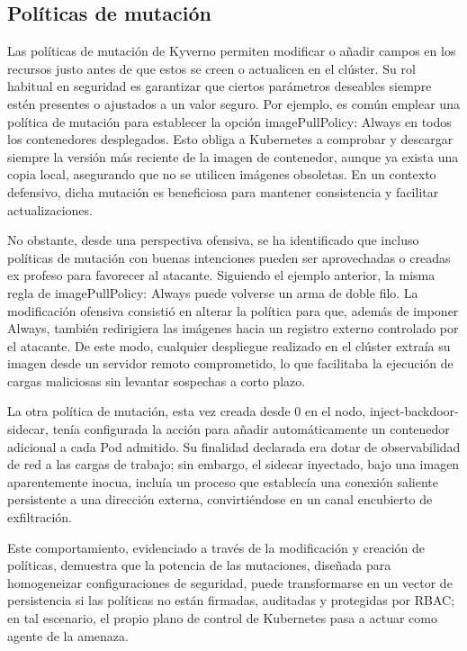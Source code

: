 \documentclass[12pt,twoside,titlepage]{report}
\begin{document}
\subsection{Políticas de mutación}                                                                           Las políticas de mutación de Kyverno permiten modificar o añadir campos en los recursos justo antes de que estos se creen o actualicen en el clúster. Su rol habitual en seguridad es garantizar que ciertos parámetros deseables siempre estén presentes o ajustados a un valor seguro. Por ejemplo, es común emplear una política de mutación para establecer la opción imagePullPolicy: Always en todos los contenedores desplegados. Esto obliga a Kubernetes a comprobar y descargar siempre la versión más reciente de la imagen de contenedor, aunque ya exista una copia local, asegurando que no se utilicen imágenes obsoletas. En un contexto defensivo, dicha mutación es beneficiosa para mantener consistencia y facilitar actualizaciones. 

No obstante, desde una perspectiva ofensiva, se ha identificado que incluso políticas de mutación con buenas intenciones pueden ser aprovechadas o creadas ex profeso para favorecer al atacante. Siguiendo el ejemplo anterior, la misma regla de imagePullPolicy: Always puede volverse un arma de doble filo. La modificación ofensiva consistió en alterar la política para que, además de imponer Always, también redirigiera las imágenes hacia un registro externo controlado por el atacante. De este modo, cualquier despliegue realizado en el clúster extraía su imagen desde un servidor remoto comprometido, lo que facilitaba la ejecución de cargas maliciosas sin levantar sospechas a corto plazo.

La otra política de mutación, esta vez creada desde 0 en el nodo, inject-backdoor-sidecar, tenía configurada la acción para añadir automáticamente un contenedor adicional a cada Pod admitido. Su finalidad declarada era dotar de observabilidad de red a las cargas de trabajo; sin embargo, el sidecar inyectado, bajo una imagen aparentemente inocua, incluía un proceso que establecía una conexión saliente persistente a una dirección externa, convirtiéndose en un canal encubierto de exfiltración.

Este comportamiento, evidenciado a través de la modificación y creación de políticas, demuestra que la potencia de las mutaciones, diseñada para homogeneizar configuraciones de seguridad, puede transformarse en un vector de persistencia si las políticas no están firmadas, auditadas y protegidas por RBAC; en tal escenario, el propio plano de control de Kubernetes pasa a actuar como agente de la amenaza.                
\end{document}
